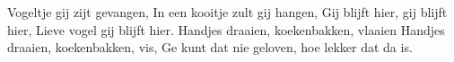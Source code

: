 \beginverse*
Vogeltje gij zijt gevangen,
In een kooitje zult gij hangen,
Gij blijft hier, gij blijft hier,
Lieve vogel gij blijft hier.
Handjes draaien, koekenbakken, vlaaien
Handjes draaien, koekenbakken, vis,
Ge kunt dat nie geloven, hoe lekker dat da is. 
\endverse
\endsong